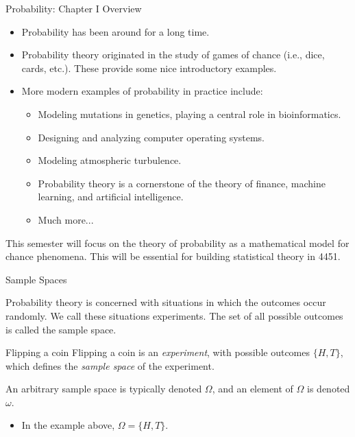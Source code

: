 \begin{frame}{Probability: Chapter I Overview}

\begin{itemize}

\item Probability has been around for a long time.
\item Probability theory originated in the study of games of chance (i.e., dice, cards, etc.). These provide some nice introductory examples. 
\item More modern examples of probability in practice include: 
\begin{itemize}
  \item Modeling mutations in genetics, playing a central role in bioinformatics.
  \item Designing and analyzing computer operating systems.
  \item Modeling atmospheric turbulence. 
  \item Probability theory is a cornerstone of the theory of finance, machine learning, and artificial intelligence.
  \item Much more...
\end{itemize}
\end{itemize}

This semester will focus on the theory of probability as a mathematical model for chance phenomena. This will be essential for building statistical theory in 4451.

\end{frame}

\begin{frame}{Sample Spaces}

Probability theory is concerned with situations in which the outcomes occur randomly.
We call these situations \alert{experiments}. 
The set of all possible outcomes is called the \alert{sample space}. 

\begin{exampleblock}{Flipping a coin}
  Flipping a coin is an \emph{experiment}, with possible outcomes $\{H, T\}$, which defines the \emph{sample space} of the experiment.
\end{exampleblock}

An arbitrary sample space is typically denoted $\Omega$, and an element of $\Omega$ is denoted $\omega$.

\pause 

\begin{itemize}
  \item In the example above, $\Omega = \{H, T\}$. 
\end{itemize}

\end{frame}

